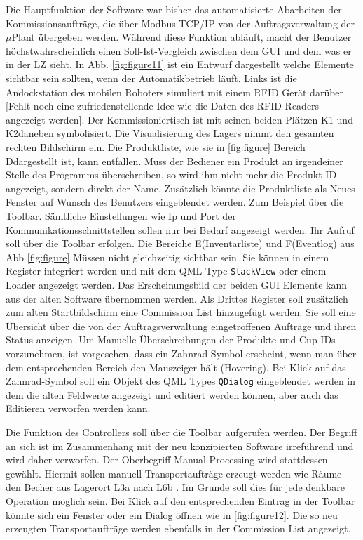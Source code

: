 Die Hauptfunktion der Software war bisher das automatisierte Abarbeiten der Kommissionsaufträge, die über Modbus TCP/IP
von der Auftragsverwaltung der $\mu$Plant übergeben werden.
Während diese Funktion abläuft, macht der Benutzer höchstwahrscheinlich einen Soll-Ist-Vergleich zwischen dem GUI
und dem was er in der LZ sieht.
In Abb. \ref{fig:figure11} ist ein Entwurf dargestellt welche Elemente sichtbar sein sollten, wenn der Automatikbetrieb läuft.
Links ist die Andockstation des mobilen Roboters simuliert mit einem RFID Gerät darüber [Fehlt noch eine zufriedenstellende Idee wie die Daten des RFID Readers angezeigt werden].
Der Kommissioniertisch ist mit seinen beiden Plätzen \glqq K1 \grqq und \glqq K2\grqq  daneben symbolisiert.
Die Visualisierung des Lagers nimmt den gesamten rechten Bildschirm ein.
Die Produktliste, wie sie in \ref{fig:figure} Bereich \glqq D\grqq dargestellt ist, kann entfallen.
Muss der Bediener ein Produkt an irgendeiner Stelle des Programms überschreiben, so wird ihm nicht mehr die Produkt ID
angezeigt, sondern direkt der Name.
Zusätzlich könnte die Produktliste als Neues Fenster auf Wunsch des Benutzers eingeblendet werden.
Zum Beispiel über die Toolbar.
Sämtliche Einstellungen wie Ip und Port der Kommunikationsschnittstellen sollen nur bei Bedarf angezeigt werden.
Ihr Aufruf soll über die Toolbar erfolgen.
Die Bereiche \glqq E\grqq (Inventarliste) und \glqq F\grqq (Eventlog) aus Abb \ref{fig:figure} Müssen nicht
gleichzeitig sichtbar sein.
Sie können in einem Register integriert werden und mit dem QML Type \verb|StackView| oder einem Loader angezeigt werden.
Das Erscheinungsbild der beiden GUI Elemente kann aus der alten Software übernommen werden.
Als Drittes Register soll zusätzlich zum alten Startbildschirm eine Commission List hinzugefügt werden.
Sie soll eine Übersicht über die von der Auftragsverwaltung eingetroffenen Aufträge und ihren Status anzeigen.
Um Manuelle Überschreibungen der Produkte und Cup IDs vorzunehmen, ist vorgesehen, dass ein Zahnrad-Symbol erscheint,
wenn man über dem entsprechenden Bereich den Mauszeiger hält (Hovering).
Bei Klick auf das Zahnrad-Symbol soll ein Objekt des QML Types \verb|QDialog| eingeblendet werden in dem die alten
Feldwerte angezeigt und editiert werden können, aber auch das Editieren verworfen werden kann.\\
\vspace{1cm}

Die Funktion des Controllers soll über die Toolbar aufgerufen werden.
Der Begriff an sich ist im Zusammenhang mit der neu konzipierten Software irreführend und wird daher verworfen.
Der Oberbegriff \glqq Manual Processing \grqq wird stattdessen gewählt.
Hiermit sollen manuell Transportaufträge erzeugt werden wie \glqq Räume den Becher aus Lagerort L3a nach L6b \grqq.
Im Grunde soll dies für jede denkbare Operation möglich sein.
Bei Klick auf den entsprechenden Eintrag in der Toolbar könnte sich ein Fenster oder ein Dialog öffnen wie in
\ref{fig:figure12}.
Die so neu erzeugten Transportaufträge werden ebenfalls in der Commission List angezeigt.

